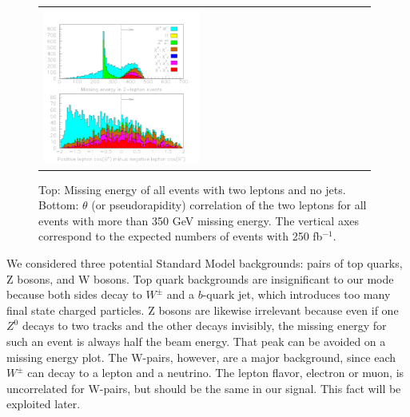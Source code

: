 \documentclass[12pt]{article}
\begin{document}
\begin{figure}[t]
\begin{center}
\begin{tabular}{p{0.49\linewidth} p{0.49\linewidth}}
      \begin{minipage}{\linewidth} \vspace{-1.2 cm} \includegraphics[width=\linewidth]{../pretty_plots/two_leptons_1_fixed_pol.pdf} \end{minipage}
    \end{tabular}


    \caption{Top: Missing energy of all events with two leptons and no
    jets.  Bottom: $\theta$ (or pseudorapidity) correlation of the two
    leptons for all events with more than 350 GeV missing energy.  The
    vertical axes correspond to the expected numbers of events with
    250 fb$^{-1}$.}

    \label{jimpbackgrounds}
  \end{center}
\end{figure}

We considered three potential Standard Model backgrounds: pairs of top
quarks, Z bosons, and W bosons.  Top quark backgrounds are
insignificant to our mode because both sides decay to $W^\pm$ and a
$b$-quark jet, which introduces too many final state charged
particles.  Z bosons are likewise irrelevant because even if one $Z^0$
decays to two tracks and the other decays invisibly, the missing
energy for such an event is always half the beam energy.  That peak
can be avoided on a missing energy plot.  The W-pairs, however, are a
major background, since each $W^\pm$ can decay to a lepton and a
neutrino.  The lepton flavor, electron or muon, is uncorrelated for
W-pairs, but should be the same in our signal.  This fact will be
exploited later.
\end{document}
